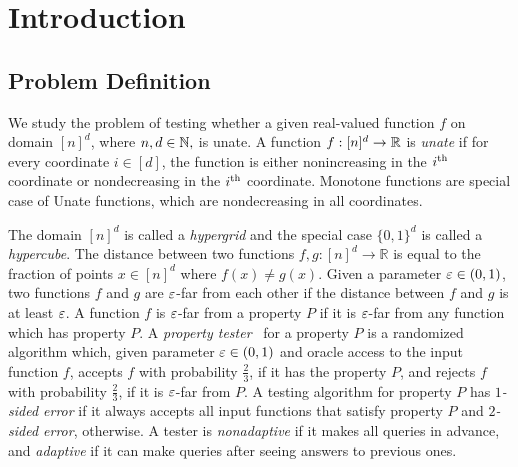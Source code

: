 \vspace*{-80mm}
\chapter{Introduction} \label{chapter1:introduction}

\section{Problem Definition}

We study the problem of testing whether a given real-valued function $f$ on domain $[n]^d$, where $n,d\in\mathbb N,$ is unate.
A function $f:[n]^d \to {\mathbb R}$ is {\em unate} if for every coordinate $i\in [d]$, the function is either nonincreasing in the ${i}^{\mathrm{th}}$ coordinate or nondecreasing in the ${i}^{\mathrm{th}}$ coordinate. Monotone functions are special case of Unate functions, which are nondecreasing in all coordinates. 

The domain $[n]^d$ is called a {\em hypergrid} and the special case $\{0,1\}^d$ is called a {\em hypercube}. The {\sf distance} between two functions $f,g:[n]^d\rightarrow \mathbb{R}$ is equal to the fraction of points $x\in [n]^d$ where $f(x)\neq g(x)$. Given a parameter $\varepsilon \in(0,1)$, two functions $f$ and $g$ are $\varepsilon$-far from each other if the distance between $f$ and $g$ is at least $\varepsilon$. A function $f$ is $\varepsilon$-far from a property $P$ if it is $\varepsilon$-far from any function which has property $P$. A {\em property tester}~\cite{GGR98,RS96} for a property $P$ is a randomized algorithm which, given parameter $\varepsilon \in(0,1)$ and oracle access to the input function $f$, accepts $f$ with probability $\frac{2}{3}$, if it has the property $P$, and rejects $f$ with probability $\frac{2}{3}$, if it is $\varepsilon$-far from $P$. A testing algorithm for property $P$ has {\em $1$-sided error} if it always accepts all input functions that satisfy  property $P$ and {\em $2$-sided error}, otherwise. A tester is {\em nonadaptive} if it makes all queries in advance, and {\em adaptive} if it can make queries after seeing answers to previous ones.

